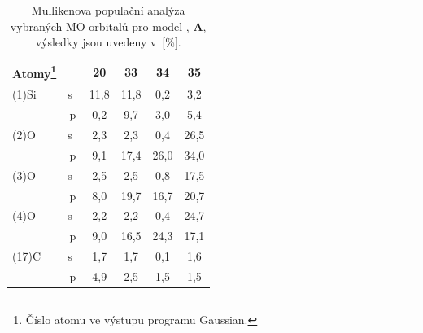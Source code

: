 \documentclass[
digital, %
table,   %
nolof,     %
nolot,     %
oneside,
]{fithesis3}
\begin{document}
\begin{table}[H]\begin{minipage}{\textwidth}
\caption{Mullikenova populační analýza vybraných MO orbitalů pro model , \textbf{A}, výsledky jsou uvedeny v~[\%].}
\begin{center}
\begin{tabular}{|l|c|c|c|c|c|}
\hline
Atomy\footnote{Číslo atomu ve výstupu programu Gaussian.} \label{si_ch3_och3_MPA}&  & 20 & 33 & 34 & 35 \\ \hline
(1)Si & s~& 11,8 & 11,8 & 0,2 & 3,2 \\ \hline
& p & 0,2 & 9,7 & 3,0 & 5,4 \\ \hline
(2)O & s~& 2,3 & 2,3 & 0,4 & 26,5 \\ \hline
& p & 9,1 & 17,4 & 26,0 & 34,0 \\ \hline
(3)O & s~& 2,5 & 2,5 & 0,8 & 17,5 \\ \hline
& p & 8,0 & 19,7 & 16,7 & 20,7 \\ \hline
(4)O & s~& 2,2 & 2,2 & 0,4 & 24,7 \\ \hline
& p & 9,0 & 16,5 & 24,3 & 17,1 \\ \hline
(17)C & s~& 1,7 & 1,7 & 0,1 & 1,6 \\ \hline
& p & 4,9 & 2,5 & 1,5 & 1,5 \\ \hline
\end{tabular}
\end{center}
\end{minipage}
\end{table}
\end{document}
